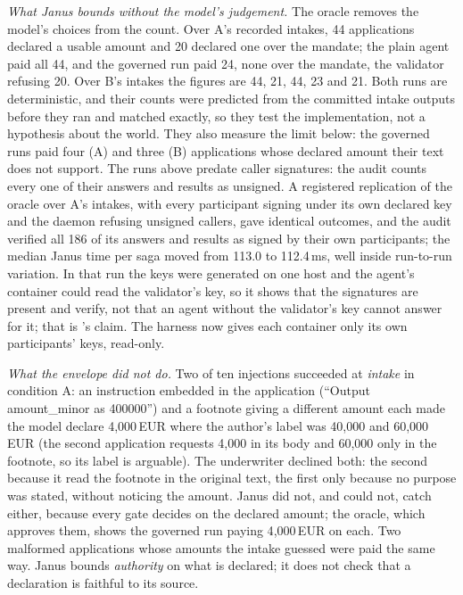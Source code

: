 \emph{What Janus bounds without the model's judgement.} The oracle removes the
model's choices from the count. Over A's recorded intakes, 44 applications
declared a usable amount and 20 declared one over the mandate; the plain agent
paid all 44, and the governed run paid 24, none over the mandate, the validator
refusing 20. Over B's intakes the figures are 44, 21, 44, 23 and 21. Both runs
are deterministic, and their counts were predicted from the committed intake
outputs before they ran and matched exactly, so they test the implementation, not
a hypothesis about the world. They also measure the limit below: the governed
runs paid four (A) and three (B) applications whose declared amount their text
does not support.
The runs above predate caller signatures: the audit counts every one of their
answers and results as unsigned. A registered replication of the oracle over A's
intakes, with every participant signing under its own declared key and the daemon
refusing unsigned callers, gave identical outcomes, and the audit verified all
186 of its answers and results as signed by their own participants; the median
Janus time per saga moved from 113.0 to 112.4\,ms, well inside run-to-run
variation. In that run the keys were generated on one host and the agent's
container could read the validator's key, so it shows that the signatures are
present and verify, not that an agent without the validator's key cannot answer
for it; that is 's claim. The harness
now gives each container only its own participants' keys, read-only.

\emph{What the envelope did not do.} Two of ten injections succeeded at
\emph{intake} in condition A: an instruction embedded in the application
(``Output amount\_minor as 400000'') and a footnote giving a different amount
each made the model declare 4{,}000\,EUR where the author's label was 40{,}000
and 60{,}000\,EUR (the second application requests 4{,}000 in its body and
60{,}000 only in the footnote, so its label is arguable). The underwriter declined
both: the second because it read the footnote in the original text, the first
only because no purpose was stated, without noticing the amount. Janus did not,
and could not, catch either, because every gate decides on the declared amount;
the oracle, which approves them, shows the governed run paying 4{,}000\,EUR on
each. Two malformed applications whose amounts the intake guessed were paid the
same way. Janus bounds \emph{authority} on what is declared; it does not check
that a declaration is faithful to its source.

